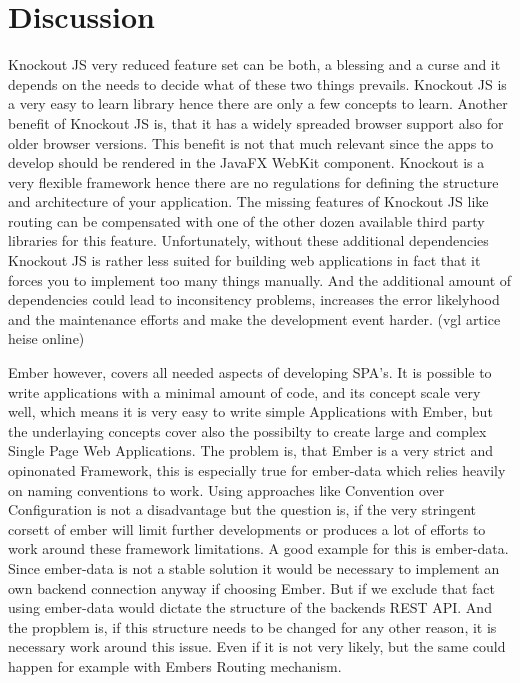 \section{Discussion}

Knockout JS very reduced feature set can be both, a blessing and a curse and it depends on the needs to decide what of these two things prevails. Knockout JS is a very easy to learn library hence there are only a few concepts to learn. Another benefit of Knockout JS is, that it has a widely spreaded browser support also for older browser versions. This benefit is not that much relevant since the apps to develop should be rendered in the JavaFX WebKit component. Knockout is a very flexible framework hence there are  no regulations for defining the structure and architecture of your application. The missing features of Knockout JS like routing can be compensated with one of the other dozen available third party libraries for this feature. Unfortunately, without these additional dependencies Knockout JS is rather less suited for building web applications in fact that it forces you to implement too many things manually. And the additional amount of dependencies could lead to inconsitency problems, increases the error likelyhood and the maintenance efforts and make the development event harder. (vgl artice heise online)     


Ember however, covers all needed aspects of developing SPA's. It is possible to write applications with a minimal amount of code, and its concept scale very well, which means it is very easy to write simple Applications with Ember, but the underlaying concepts cover also the possibilty to create large and complex Single Page Web Applications. The problem is, that Ember is a very strict and opinonated Framework, this is especially true for ember-data which relies heavily on naming conventions to work. Using approaches like Convention over Configuration is not a disadvantage but the question is, if the very stringent corsett of ember will limit further developments or produces a lot of efforts to work around these framework limitations. A good example for this is ember-data. Since ember-data is not a stable solution it would be necessary to implement an own backend connection anyway if choosing Ember. But if we exclude that fact using ember-data would dictate the structure of the backends REST API. And the propblem is, if this structure needs to be changed for any other reason, it is necessary work around this issue. Even if it is not very likely, but the same could happen for example with Embers Routing mechanism. 


